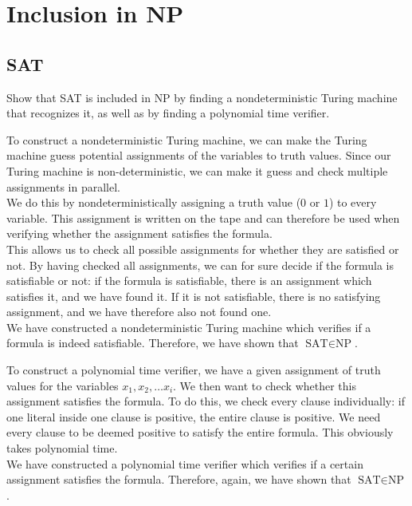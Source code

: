 

\setcounter{section}{2}


\section{Inclusion in \textsc{NP}}

\subsection{SAT}

Show that \textsc{SAT} is included in \textsc{NP} by finding a nondeterministic Turing machine that recognizes it, as well as by finding a polynomial time verifier.

To construct a nondeterministic Turing machine, we can make the Turing machine guess potential assignments of the variables to truth values. Since our Turing machine is non-deterministic, we can make it guess and check multiple assignments in parallel.\\
We do this by nondeterministically assigning a truth value ($0$ or $1$) to every variable. This assignment is written on the tape and can therefore be used when verifying whether the assignment satisfies the formula.\\
This allows us to check all possible assignments for whether they are satisfied or not. By having checked all assignments, we can for sure decide if the formula is satisfiable or not: if the formula is satisfiable, there is an assignment which satisfies it, and we have found it. If it is not satisfiable, there is no satisfying assignment, and we have therefore also not found one.\\
We have constructed a nondeterministic Turing machine which verifies if a formula is indeed satisfiable. Therefore, we have shown that $\text{SAT} \in \text{NP}$.

To construct a polynomial time verifier, we have a given assignment of truth values for the variables $x_{1},x_{2},\ldots x_{i}$. We then want to check whether this assignment satisfies the formula. To do this, we check every clause individually: if one literal inside one clause is positive, the entire clause is positive. We need every clause to be deemed positive to satisfy the entire formula. This obviously takes polynomial time.\\
We have constructed a polynomial time verifier which verifies if a certain assignment satisfies the formula. Therefore, again, we have shown that $\text{SAT} \in \text{NP}$.

